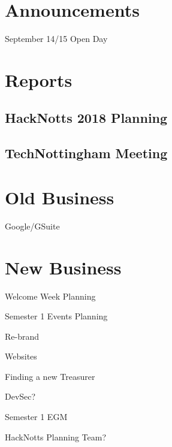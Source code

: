 \documentclass[11pt,hacksoc,agenda]{meetingmins}
\begin{document}
\maketitle

\section{Announcements}
\begin{items}
	\item
	September 14/15 Open Day
\end{items}

\section{Reports}

\subsection{HackNotts 2018 Planning}
\begin{hiddensubitems}
	\item
\end{hiddensubitems}

\subsection{TechNottingham Meeting}
\begin{hiddensubitems}
	\item
\end{hiddensubitems}

\section{Old Business}
\begin{items}
	\item
	Google/GSuite
\end{items}

\section{New Business}
\begin{items}
	\item
	Welcome Week Planning
	
	\item
	Semester 1 Events Planning
	
	\item
	Re-brand
	
	\item
	Websites
	
	\item
	Finding a new Treasurer
	
	\item
	DevSec?
	
	\item
	Semester 1 EGM
	
	\item
	HackNotts Planning Team?
\end{items}

\vspace{1em}
\nextmeeting{}
\end{document}
